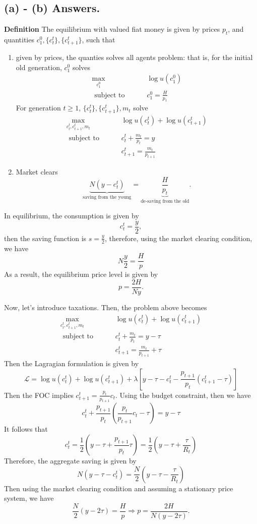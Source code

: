 \documentclass[11pt]{article}
\theoremstyle{definition}
\theoremstyle{boldtitle} %
\numberwithin{equation}{section}
\numberwithin{figure}{section}
\numberwithin{table}{section}
\begin{document}
\subsection{(a) - (b) Answers.}
\textbf{Definition}
The equilibrium with valued fiat money is given by prices ${p_t}$, and quantities 
$c^0_1, \{c_t^t \}, \{c_{t+1}^t \}$, such that 
\begin{enumerate}
    \item given by prices, the quanties solves all agents problem:
    that is, 
    for the initial old generation, $c^0_1$ solves 
    \begin{align*}
    \max_{c^0_1} \quad & \log u(c^0_1) \\ 
    \text{ subject to } \qquad & c^0_1 =  \frac{H}{p_1}
    \end{align*}
    For generation $t \geq 1$, $\{c^t_t\}, \{c^t_{t+1}\}, m_t$ solve 
    \begin{align*}
    \max_{c^t_t, c^t_{t+1}, m_t } \quad & \log u(c^t_t) +  \log u(c^t_{t+1}) \\ 
    \text{ subject to } \qquad & c^t_t + \frac{m_t}{p_t} =  y \\
    & c^t_{t+1}  =  \frac{m_t}{p_{t+1}}
    \end{align*}
    \item Market clears 
    \[
    \underbrace{N(y - c^t_t)}_{\text{saving from the young}} = \underbrace{\frac{H}{p_t}}_{\text{de-saving from the old}}.
    \]
\end{enumerate}
In equilibrium, the consumption is given by 
\[
c_t^t = \frac{y}{2},
\]
then the saving function is $s = \frac{y}{2}$,
therefore, using the market clearing condition, we have 
\[
N \frac{y}{2} = \frac{H}{p}
\]
As a result, the equilibrium price level is given by 
\[
p = \frac{2H}{Ny}.
\]

Now, let's introduce taxations. Then, the problem above becomes 
\begin{align*}
    \max_{c^t_t, c^t_{t+1}, m_t} \quad & \log u(c^t_t) +  \log u(c^t_{t+1}) \\ 
    \text{ subject to } \qquad & c^t_t + \frac{m_t}{p_t} =  y - \tau  \\
    & c^t_{t+1} = \frac{m_t}{p_{t+1}} +  \tau
\end{align*}
Then the Lagragian formulation is given by 
\[
\mathcal{L} = \log u(c^t_t) +  \log u(c^t_{t+1}) + \lambda \left[y - \tau - c_t^t - \frac{p_{t+1}}{p_t}(c_{t+1}^t - \tau )\right]
\]
Then the FOC implies $c^t_{t+1} = \frac{p_t}{p_{t+1}} c_t$.
Using the budget constraint, then we have 
\[
c_t^t + \frac{p_{t+1}}{p_t}(\frac{p_t}{p_{t+1}} c_t - \tau) = y - \tau
\]
It follows that 
\[
c_t^t = \frac{1 }{2}(y - \tau + \frac{p_{t+1}}{p_t} \tau) = \frac{1 }{2}(y - \tau + \frac{\tau}{R_t})
\]
Therefore, the aggregate saving is given by 
\[
N (y - \tau - c_t^t) = \frac{N}{2}(y - \tau - \frac{\tau}{R_t})
\]
Then using the market clearing condition and assuming a stationary price system, we have 
\[
\frac{N}{2}(y - 2 \tau) = \frac{H}{p} \Rightarrow p = \frac{2H}{N(y - 2 \tau)}.
\]
\end{document}
